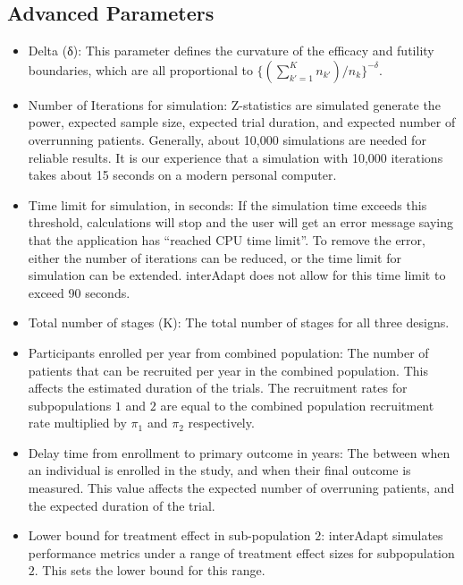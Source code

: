 \documentclass{article}
\newcommand{\interAdapt}{\textsf{interAdapt }}
\begin{document}
\subsection*{Advanced Parameters}

\begin{itemize}

\item Delta (δ): This parameter defines the curvature of the efficacy and futility boundaries, which are all proportional to $\{(\sum_{k'=1}^{K} n_{k'})/n_k\}^{-δ}$.

\item Number of Iterations for simulation: Z-statistics are simulated generate the power, expected sample size, expected trial duration, and expected number of overrunning patients. Generally, about 10,000 simulations are needed for reliable results. It is our experience that a simulation with 10,000 iterations takes about 15 seconds on a modern personal computer.

\item Time limit for simulation, in seconds: If the simulation time exceeds this threshold, calculations will stop and the user will get an error message saying that the application has “reached CPU time limit”. To remove the error, either the number of iterations can be reduced, or the time limit for simulation can be extended. \interAdapt does not allow for this time limit to exceed 90 seconds.

\item Total number of stages (K): The total number of stages for all three designs. 

\item Participants enrolled per year from combined population: The number of patients that can be recruited per year in the combined population. This affects the estimated duration of the trials. The recruitment rates for  subpopulations $1$ and $2$ are equal to the combined population recruitment rate multiplied by $π_1$ and $π_2$ respectively. %

\item Delay time from enrollment to primary outcome in years: The between when an individual is enrolled in the study, and when their final outcome is measured. This value affects the expected number of overruning patients, and the expected duration of the trial.

\item Lower bound for treatment effect in sub-population $2$: \interAdapt simulates performance metrics under a range of treatment effect sizes for subpopulation $2$. This sets the lower bound for this range.


\end{itemize}
\end{document}
